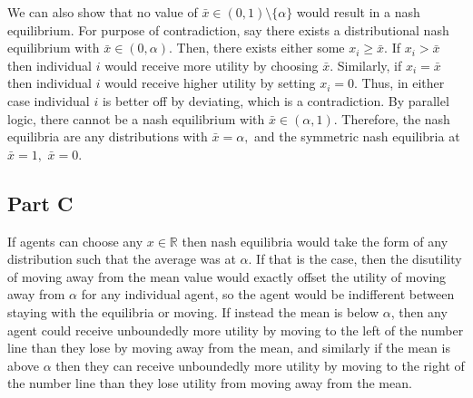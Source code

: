 \documentclass[11pt]{article} %
\begin{document}
We can also show that no value of $\bar{x} \in (0,1) \setminus \{ \alpha\}$ would result in a nash equilibrium. For purpose of contradiction, say there exists a distributional nash equilibrium with $\bar{x} \in (0,\alpha).$ Then, there exists either some $x_i \geq \bar{x}$. If $x_i>\bar{x}$ then individual $i$ would receive more utility by choosing $\bar{x}.$ Similarly, if $x_i = \bar{x}$ then individual $i$ would receive higher utility by setting $x_i = 0$. Thus, in either case individual $i$ is better off by deviating, which is a contradiction. By parallel logic, there cannot be a nash equilibrium with  $\bar{x} \in (\alpha,1).$ Therefore, the nash equilibria are any distributions with $\bar{x} = \alpha,$ and the symmetric nash equilibria at $\bar{x} = 1,$ $\bar{x} = 0.$
\subsection{Part C}
If agents can choose any $x\in \mathbb{R}$ then nash equilibria would take the form of any distribution such that the average was at $\alpha$. If that is the case, then the disutility of moving away from the mean value would exactly offset the utility of moving away from $\alpha$ for any individual agent, so the agent would be indifferent between staying with the equilibria or moving. If instead the mean is below $\alpha$, then any agent could receive unboundedly more utility by moving to the left of the number line than they lose by moving away from the mean, and similarly if the mean is above $\alpha$ then they can receive unboundedly more utility by moving to the right of the number line than they lose utility from moving away from the mean.
\end{document}
